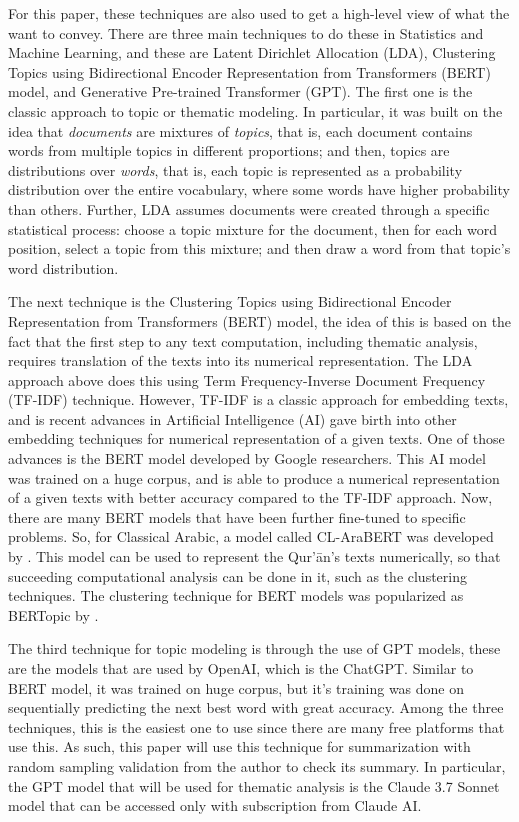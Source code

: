For this paper, these techniques are also used to get a high-level view of what the   want to convey. There are three main techniques to do these in Statistics and Machine Learning, and these are Latent Dirichlet Allocation (LDA), Clustering Topics using Bidirectional Encoder Representation from Transformers (BERT) model, and Generative Pre-trained Transformer (GPT). The first one is the classic approach to topic or thematic modeling. In particular, it was built on the idea that \textit{documents} are mixtures of \textit{topics}, that is, each document contains words from multiple topics in different proportions; and then, topics are distributions over \textit{words}, that is, each topic is represented as a probability distribution over the entire vocabulary, where some words have higher probability than others. Further, LDA assumes documents were created through a specific statistical process: choose a topic mixture for the document, then for each word position, select a topic from this mixture; and then draw a word from that topic's word distribution.

The next technique is the Clustering Topics using Bidirectional Encoder Representation from Transformers (BERT) model, the idea of this is based on the fact that the first step to any text computation, including thematic analysis, requires translation of the texts into its numerical representation. The LDA approach above does this using Term Frequency-Inverse Document Frequency (TF-IDF) technique. However, TF-IDF is a classic approach for embedding texts, and is recent advances in Artificial Intelligence (AI) gave birth into other embedding techniques for numerical representation of a given texts. One of those advances is the BERT model developed by Google researchers. This AI model was trained on a huge corpus, and is able to produce a numerical representation of a given texts with better accuracy compared to the TF-IDF approach. Now, there are many BERT models that have been further fine-tuned to specific problems. So, for Classical Arabic, a model called CL-AraBERT was developed by . This model can be used to represent the Qur'\=an's texts numerically, so that succeeding computational analysis can be done in it, such as the clustering techniques. The clustering technique for BERT models was popularized as BERTopic by .

The third technique for topic modeling is through the use of GPT models, these are the models that are used by OpenAI, which is the ChatGPT. Similar to BERT model, it was trained on huge corpus, but it's training was done on sequentially predicting the next best word with great accuracy. Among the three techniques, this is the easiest one to use since there are many free platforms that use this. As such, this paper will use this technique for summarization with random sampling validation from the author to check its summary. In particular, the GPT model that will be used for thematic analysis is the Claude 3.7 Sonnet model that can be accessed only with subscription from Claude AI.

